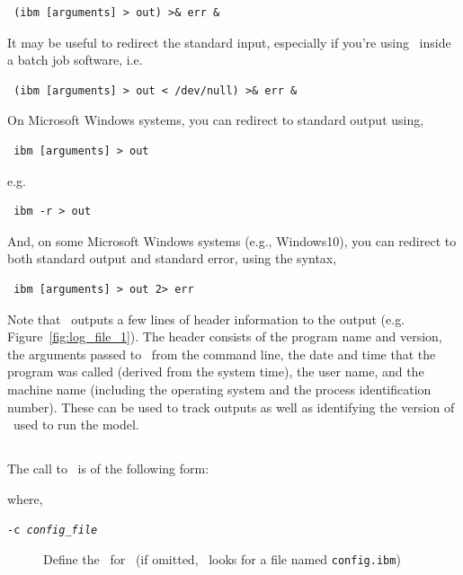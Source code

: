 \begin{verbatim} (ibm [arguments] > out) >& err &\end{verbatim}

It may be useful to redirect the standard input, especially if you're using \IBM\ inside a batch job software, i.e. 

\begin{verbatim} (ibm [arguments] > out < /dev/null) >& err &\end{verbatim}

On Microsoft Windows systems, you can redirect to standard output using,

\begin{verbatim} ibm [arguments] > out\end{verbatim}

e.g.

\begin{verbatim} ibm -r > out\end{verbatim}

And, on some Microsoft Windows systems (e.g., Windows10), you can redirect to both standard output and standard error, using the syntax, 

\begin{verbatim} ibm [arguments] > out 2> err\end{verbatim}

Note that \IBM\ outputs a few lines of header information to the output (e.g. Figure~\ref{fig:log_file_1}). The header consists of the program name and version, the arguments passed to \IBM\ from the command line, the date and time that the program was called (derived from the system time), the user name, and the machine name (including the operating system and the process identification number). These can be used to track outputs as well as identifying the version of \IBM\ used to run the model.


\subsection{\label{sec:command-line-arguments}}

The call to \IBM\ is of the following form: 

\texttt{}

where, 

\begin{description}
  \item [\texttt{-c \emph{config\_file}}] Define the \config\ for \IBM\ (if omitted, \IBM\ looks for a file named \texttt{config.ibm})
\end{description}

